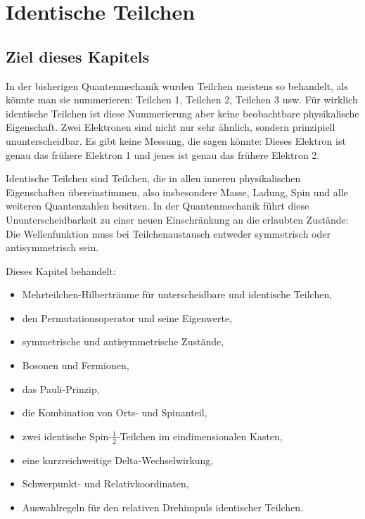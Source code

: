\providecommand{\ket}[1]{\left|#1\right\rangle}
\providecommand{\bra}[1]{\left\langle#1\right|}
\providecommand{\braket}[2]{\left\langle#1\middle|#2\right\rangle}
\providecommand{\mel}[3]{\left\langle#1\middle|#2\middle|#3\right\rangle}
\providecommand{\ii}{\mathrm{i}}
\providecommand{\e}{\mathrm{e}}
\providecommand{\idop}{\mathbf{1}}
\providecommand{\opH}{\hat H}
\providecommand{\opP}{\hat P}
\providecommand{\opPi}{\hat\Pi}
\providecommand{\opS}{\hat S}
\providecommand{\opA}{\hat A}
\providecommand{\Rcm}{\vec R}
\providecommand{\pcm}{\vec P}
\providecommand{\rrel}{\vec r}
\providecommand{\prel}{\vec p}

\chapter{Identische Teilchen}

\section{Ziel dieses Kapitels}

In der bisherigen Quantenmechanik wurden Teilchen meistens so behandelt, als könnte man sie nummerieren: Teilchen 1, Teilchen 2, Teilchen 3 usw. Für wirklich identische Teilchen ist diese Nummerierung aber keine beobachtbare physikalische Eigenschaft. Zwei Elektronen sind nicht nur sehr ähnlich, sondern prinzipiell ununterscheidbar. Es gibt keine Messung, die sagen könnte: Dieses Elektron ist genau das frühere Elektron 1 und jenes ist genau das frühere Elektron 2.

\begin{conceptbox}
Identische Teilchen sind Teilchen, die in allen inneren physikalischen Eigenschaften übereinstimmen, also insbesondere Masse, Ladung, Spin und alle weiteren Quantenzahlen besitzen. In der Quantenmechanik führt diese Ununterscheidbarkeit zu einer neuen Einschränkung an die erlaubten Zustände: Die Wellenfunktion muss bei Teilchenaustausch entweder symmetrisch oder antisymmetrisch sein.
\end{conceptbox}

Dieses Kapitel behandelt:
\begin{itemize}
    \item Mehrteilchen-Hilberträume für unterscheidbare und identische Teilchen,
    \item den Permutationsoperator und seine Eigenwerte,
    \item symmetrische und antisymmetrische Zustände,
    \item Bosonen und Fermionen,
    \item das Pauli-Prinzip,
    \item die Kombination von Orts- und Spinanteil,
    \item zwei identische Spin-\(\frac12\)-Teilchen im eindimensionalen Kasten,
    \item eine kurzreichweitige Delta-Wechselwirkung,
    \item Schwerpunkt- und Relativkoordinaten,
    \item Auswahlregeln für den relativen Drehimpuls identischer Teilchen.
\end{itemize}

